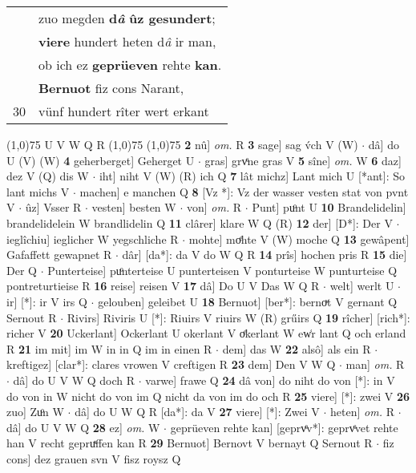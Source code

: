 \documentclass[8pt,a4paper,notitlepage]{article}
\begin{document}
\begin{table}[ht]
\begin{minipage}[t]{0.5\linewidth}
\begin{tabular}{rl}
 & zuo megden \textbf{d\textit{â}} \textbf{ûz gesundert};\\ 
 & \textbf{viere} hundert heten d\textit{â} ir man,\\ 
 & ob ich ez \textbf{geprüeven} rehte \textbf{kan}.\\ 
 & \textbf{Bernuot} fiz cons Narant,\\ 
30 & vünf hundert rîter wert erkant\\ 
\end{tabular}
\scriptsize
\line(1,0){75} \newline
U V W Q R \newline
\line(1,0){75} \newline
\newline
\line(1,0){75} \newline
\textbf{2} nû] \textit{om.} R \textbf{3} sage] sag v́ch V (W)  $\cdot$ dâ] do U (V) (W) \textbf{4} geherberget] Geherget U  $\cdot$ gras] grvͤne gras V \textbf{5} sîne] \textit{om.} W \textbf{6} daz] dez V (Q) dis W  $\cdot$ iht] niht V (W) (R) ich Q \textbf{7} lât michz] Lant mich U [*ant]: So lant michs V  $\cdot$ machen] e manchen Q \textbf{8} [Vz *]: Vz der wasser vesten stat von pvnt V  $\cdot$ ûz] Vsser R  $\cdot$ vesten] besten W  $\cdot$ von] \textit{om.} R  $\cdot$ Punt] puͦnt U \textbf{10} Brandelidelin] brandelidelein W brandlidelin Q \textbf{11} clârer] klare W Q (R) \textbf{12} der] [D*]: Der V  $\cdot$ ieglîchiu] ieglicher W yegschliche R  $\cdot$ mohte] moͤhte V (W) moche Q \textbf{13} gewâpent] Gafaffett gewapnet R  $\cdot$ dâr] [da*]: da V do W Q R \textbf{14} prîs] hochen pris R \textbf{15} die] Der Q  $\cdot$ Punterteise] puͦnterteise U punterteisen V ponturteise W punturteise Q pontreturtieise R \textbf{16} reise] reisen V \textbf{17} dâ] Do U V Das W Q R  $\cdot$ welt] werlt U  $\cdot$ ir] [*]: ir V irs Q  $\cdot$ gelouben] geleibet U \textbf{18} Bernuot] [ber*]: bernoͮt V gernant Q Sernout R  $\cdot$ Rivirs] Riviris U [*]: Riuirs V riuirs W (R) grűirs Q \textbf{19} rîcher] [rich*]: richer V \textbf{20} Uckerlant] Ockerlant U okerlant V oͤkerlant W ew͑r lant Q och erland R \textbf{21} im mit] im W in in Q im in einen R  $\cdot$ dem] das W \textbf{22} alsô] als ein R  $\cdot$ kreftigez] [clar*]: clares vrowen V creftigen R \textbf{23} dem] Den V W Q  $\cdot$ man] \textit{om.} R  $\cdot$ dâ] do U V W Q doch R  $\cdot$ varwe] frawe Q \textbf{24} dâ von] do niht do von [*]: in V do von in W nicht do von im Q nicht da von im do och R \textbf{25} viere] [*]: zwei V \textbf{26} zuo] Zuͦn W  $\cdot$ dâ] do U W Q R [da*]: da V \textbf{27} viere] [*]: Zwei V  $\cdot$ heten] \textit{om.} R  $\cdot$ dâ] do U V W Q \textbf{28} ez] \textit{om.} W  $\cdot$ geprüeven rehte kan] [geprvͤv*]: geprvͤvet rehte han V recht gepruͯffen kan R \textbf{29} Bernuot] Bernovt V bernayt Q Sernout R  $\cdot$ fiz cons] dez grauen svn V fisz roysz Q \newline
\end{minipage}
\end{table}
\end{document}
